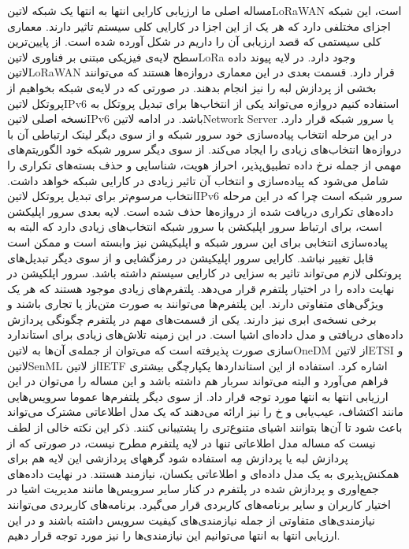 مساله اصلی ما ارزیابی کارایی انتها به انتها یک شبکه ‌لاتین{LoRaWAN} است، این شبکه اجزای مختلفی دارد که هر یک از این اجزا در کارایی کلی سیستم تاثیر دارند.
معماری کلی سیستمی که قصد ارزیابی آن را داریم در شکل  آورده شده است.
از پایین‌ترین سطح لایه‌ی فیزیکی مبتنی بر فناوری ‌لاتین{LoRa} وجود دارد.
در لایه پیوند داده ‌لاتین{LoRaWAN} قرار دارد.
قسمت بعدی در این معماری دروازه‌ها هستند که می‌توانند بخشی از پردازش لبه را نیز انجام بدهند. در صورتی که در لایه‌ی شبکه بخواهیم از پروتکل ‌لاتین{IPv6} استفاده کنیم
دروازه می‌تواند یکی از انتخاب‌ها برای تبدیل پروتکل به نسخه اصلی ‌لاتین{IPv6} باشد.
در ادامه ‌لاتین{Network Server} یا سرور شبکه قرار دارد. در این مرحله انتخاب پیاده‌سازی خود سرور شبکه و از سوی دیگر لینک ارتباطی آن با
دروازه‌ها انتخاب‌های زیادی را ایجاد می‌کند. از سوی دیگر سرور شبکه خود الگوریتم‌های مهمی از جمله نرخ داده تطبیق‌پذیر، احراز هویت، شناسایی و حذف بسته‌های تکراری را شامل می‌شود
که پیاده‌سازی و انتخاب آن تاثیر زیادی در کارایی شبکه خواهد داشت. انتخاب مرسوم‌تر برای تبدیل پروتکل ‌لاتین{IPv6} سرور شبکه است چرا که در این مرحله داده‌های تکراری دریافت شده از
دروازه‌ها حذف شده است.
لایه بعدی سرور اپلیکشن است، برای ارتباط سرور اپلیکشن با سرور شبکه انتخاب‌های زیادی دارد که البته به پیاده‌سازی انتخابی برای این سرور شبکه و اپلیکیشن نیز وابسته است
و ممکن است قابل تغییر نباشد. کارایی سرور اپلیکیشن در رمزگشایی و از سوی دیگر تبدیل‌های پروتکلی لازم می‌تواند تاثیر به سزایی در کارایی سیستم داشته باشد.
سرور اپلکیشن در نهایت داده را در اختیار پلتفرم قرار می‌دهد. پلتفرم‌های زیادی موجود هستند که هر یک ویژگی‌های متفاوتی دارند.
این پلتفرم‌ها می‌توانند به صورت متن‌باز یا تجاری باشند و برخی نسخه‌ی ابری نیز دارند.
یکی از قسمت‌های مهم
در پلتفرم چگونگی پردازش داده‌های دریافتی و مدل داده‌ای اشیا است. در این زمینه تلاش‌های زیادی برای استاندارد سازی صورت پذیرفته است که می‌توان از
جمله‌ی آن‌ها به ‌لاتین{OneDM} از ‌لاتین{ETSI} و ‌لاتین{SenML} از ‌لاتین{IETF} اشاره کرد. استفاده از این استانداردها یکپارچگی
بیشتری فراهم می‌آورد و البته می‌تواند سربار هم داشته باشد و این مساله را می‌توان در این ارزیابی انتها به انتها مورد توجه قرار داد.
از سوی دیگر پلتفرم‌ها عموما سرویس‌هایی مانند اکتشاف، عیب‌یابی و ‌خ را نیز ارائه می‌دهند که یک مدل اطلاعاتی مشترک می‌تواند باعث شود تا آن‌ها
بتوانند اشیای متنوع‌تری را پشتیبانی کنند.
ذکر این نکته خالی از لطف نیست که مساله مدل اطلاعاتی تنها در لایه پلتفرم مطرح نیست، در صورتی که از پردازش لبه یا پردازش مِه استفاده شود گرههای پردازشی این لایه
هم برای همکنش‌پذیری به یک مدل داده‌ای و اطلاعاتی یکسان، نیازمند هستند.
در نهایت داده‌های جمع‌اوری و پردازش شده در پلتفرم در کنار سایر سرویس‌ها مانند مدیریت اشیا در اختیار کاربران و سایر برنامه‌های کاربردی قرار می‌گیرد.
برنامه‌های کاربردی می‌توانند نیازمندی‌های متفاوتی از جمله نیازمندی‌های کیفیت سرویس داشته باشند و در این ارزیابی انتها به انتها می‌توانیم این نیازمندی‌ها را
نیز مورد توجه قرار دهیم.

